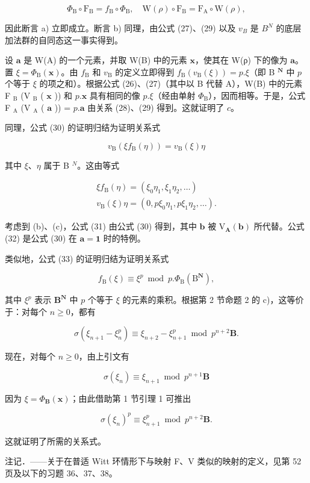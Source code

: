 \[
\Phi_ {\mathrm{B}} \circ \mathrm{F} _ {\mathrm{B}} = f _ {\mathrm{B}} \circ \Phi_ {\mathrm{B}}, \quad \mathrm{W} (\rho) \circ \mathrm{F} _ {\mathrm{B}} = \mathrm{F} _ {\mathrm{A}} \circ \mathrm{W} (\rho),
\]

因此断言 a) 立即成立。断言 b) 同理，由公式 (27)、(29) 以及 \(v_{B}\) 是 \(B^{N}\) 的底层加法群的自同态这一事实得到。

设 \(\pmb{a}\) 是 W(A) 的一个元素，并取 W(B) 中的元素 \(\pmb{x}\)，使其在 W(ρ) 下的像为 \(\pmb{a}\)。置 \(\xi = \Phi_{\mathrm{B}}(\pmb{x})\)。由 \(f_{\mathrm{B}}\) 和 \(v_{\mathrm{B}}\) 的定义立即得到 \(f_{\mathrm{B}}(v_{\mathrm{B}}(\xi)) = p.\xi\)（即 B \(^{\mathbf{N}}\) 中 \(p\) 个等于 \(\xi\) 的项之和）。根据公式 (26)、(27)（其中以 B 代替 A），W(B) 中的元素 F \(_{\mathrm{B}}\) (V \(_{\mathrm{B}}\) ( \(\pmb{x}\) )) 和 \(p.\pmb{x}\) 具有相同的像 \(p.\xi\)（经由单射 \(\Phi_{\mathrm{B}}\)），因而相等。于是，公式 F \(_{\mathrm{A}}\) (V \(_{\mathrm{A}}\) ( \(\pmb{a}\) )) = \(p.\pmb{a}\) 由关系 (28)、(29) 得到。这就证明了 \(c\)。

同理，公式 (30) 的证明归结为证明关系式

\[
v _ {\mathrm{B}} (\xi f _ {\mathrm{B}} (\eta)) = v _ {\mathrm{B}} (\xi) \eta
\]

其中 \(\xi\)、\(\eta\) 属于 B \(^{N}\)。这由等式

\[
\begin{array}{l} \xi f _ {\mathrm{B}} (\eta) = (\xi_ {0} \eta_ {1}, \xi_ {1} \eta_ {2}, \dots) \\ v _ {\mathrm{B}} (\xi) \eta = (0, p \xi_ {0} \eta_ {1}, p \xi_ {1} \eta_ {2}, \dots). \end{array}
\]

考虑到 (b)、(c)，公式 (31) 由公式 (30) 得到，其中 \(\boldsymbol{b}\) 被 \(\mathrm{V}_{\mathbf{A}}(\boldsymbol{b})\) 所代替。公式 (32) 是公式 (30) 在 \(\boldsymbol{a} = \boldsymbol{1}\) 时的特例。

类似地，公式 (33) 的证明归结为证明关系式

\[
f _ {\mathrm{B}} (\xi) \equiv \xi^ {p} \bmod p. \Phi_ {\mathrm{B}} (\mathrm{B} ^ {\mathbf {N}}),
\]

其中 \(\xi^{p}\) 表示 \(\mathbf{B}^{\mathbf{N}}\) 中 \(p\) 个等于 \(\xi\) 的元素的乘积。根据第 2 节命题 2 的 c)，这等价于：对每个 \(n \geqslant 0\)，都有

\[
\sigma \left(\xi_ {n + 1} - \xi_ {n} ^ {p}\right) \equiv \xi_ {n + 2} - \xi_ {n + 1} ^ {p} \bmod p ^ {n + 2} \mathbf {B}.
\]

现在，对每个 \(n \geqslant 0\)，由上引文有

\[
\sigma (\xi_ {n}) \equiv \xi_ {n + 1} \bmod p ^ {n + 1} \mathbf {B}
\]

因为 \(\xi = \Phi_{\mathbf{B}}(\boldsymbol{x})\)；由此借助第 1 节引理 1 可推出

\[
\sigma (\xi_ {n}) ^ {p} \equiv \xi_ {n + 1} ^ {p} \bmod p ^ {n + 2} \mathbf {B}.
\]

这就证明了所需的关系式。

注记．——关于在普适 Witt 环情形下与映射 F、V 类似的映射的定义，见第 52 页及以下的习题 36、37、38。

